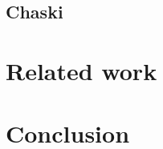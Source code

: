 \documentclass{sig-alternate}
\newcommand{\seclabel}[1]{\label{sec:#1}}
\begin{document}
\subsection{Chaski}


\section{Related work}\seclabel{relatedwork}



\section{Conclusion}\seclabel{conclusion}




\end{document}
